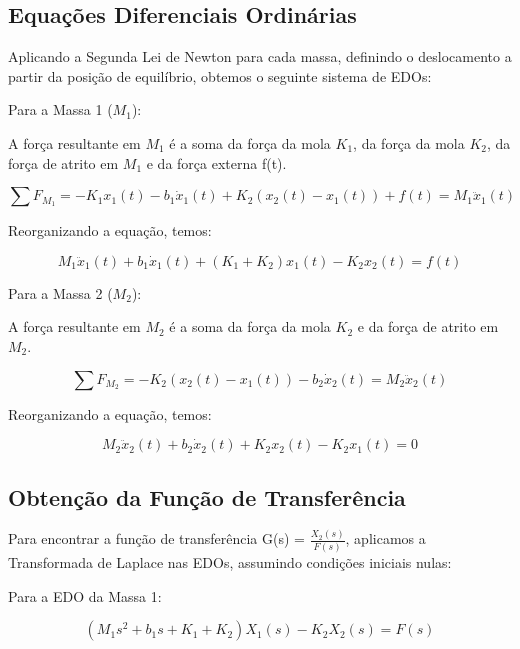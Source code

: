 \documentclass[9pt,a4paper,twocolumn,twoside]{tau-class/tau}
\begin{document}
\subsection{Equações Diferenciais Ordinárias}

Aplicando a Segunda Lei de Newton para cada massa, definindo o deslocamento a partir da posição de equilíbrio, obtemos o seguinte sistema de EDOs:

Para a Massa 1 ($M_1$):

A força resultante em $M_1$ é a soma da força da mola $K_1$, da força da mola $K_2$, da força de atrito em $M_1$ e da força externa f(t).

\begin{equation}
    \sum F_{M_1} = -K_1 x_1(t) - b_1 \dot x_1(t) + K_2(x_2(t) - x_1(t)) + f(t) = M_1 \ddot{x}_1(t)
\label{eq:SomaM1}
\end{equation}

Reorganizando a equação, temos:

\begin{equation}
    M_1 \ddot{x}_1(t) + b_1 \dot x_1(t) + (K_1 + K_2) x_1(t) - K_2x_2(t) = f(t)
\label{eq:Reorg}
\end{equation}

Para a Massa 2 ($M_2$):

A força resultante em $M_2$ é a soma da força da mola $K_2$ e da força de atrito em $M_2$.

\begin{equation}
    \sum F_{M_2} = -K_2(x_2(t) - x_1(t)) - b_2\dot{x}_2(t) = M_2 \ddot{x}_2(t)
    \label{eq:M2}
\end{equation}

Reorganizando a equação, temos:

\begin{equation}
    M_2 \ddot{x}_2(t) + b_2\dot{x}_2(t) + K_2 x_2(t) - K_2 x_1(t) =  0
    \label{M2reorg}
\end{equation}

\subsection{Obtenção da Função de Transferência}

Para encontrar a função de transferência G(s) = $\frac{X_2(s)}{F(s)}$, aplicamos a Transformada de Laplace nas EDOs, assumindo condições iniciais nulas:

Para a EDO da Massa 1:

\begin{equation}
    (M_1s^2 + b_1s + K_1 + K_2)X_1(s) - K_2X_2(s) = F(s)
    \label{eq:EDOM1}
\end{equation}
\end{document}
